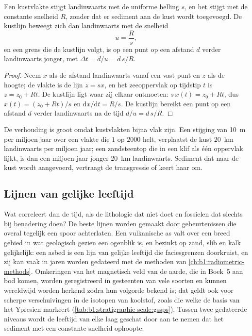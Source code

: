 \begin{proposition}\label{prop:b1:stratigraphic-scale:transgression}
Een kustvlakte stijgt landinwaarts met de uniforme helling $s$, en het  stijgt met de constante snelheid $R$, zonder dat er sediment aan de kust wordt toegevoegd. De kustlijn beweegt zich dan landinwaarts met de snelheid
\[
  u = \frac{R}{s},
\]
en een grens die de kustlijn volgt, is op een punt op een afstand $d$ verder landinwaarts jonger, met $\Delta t = d/u = d\,s/R$.
\end{proposition}

\begin{proof}
Neem $x$ als de afstand landinwaarts vanaf een vast punt en $z$ als de hoogte; de vlakte is de lijn $z = s x$, en het zeeoppervlak op tijdstip $t$ is $z = z_0 + R t$. De kustlijn ligt waar zij elkaar ontmoeten: $s\,x(t) = z_0 + R t$, dus $x(t) = (z_0 + R t)/s$ en $\mathrm dx/\mathrm dt = R/s$. De kustlijn bereikt een punt op een afstand $d$ verder landinwaarts na de tijd $d/u = d\,s/R$.
\end{proof}

De verhouding is groot omdat kustvlakten bijna vlak zijn. Een stijging van \qty{10}{m} per miljoen jaar over een vlakte die $1$ op $2000$ helt, verplaatst de kust \qty{20}{km} landinwaarts per miljoen jaar; een zandsteentop die in een klif als één oppervlak lijkt, is dan een miljoen jaar jonger \qty{20}{km} landinwaarts. Sediment dat naar de kust wordt aangevoerd, vertraagt de transgressie of keert haar om.

\subsection*{Lijnen van gelijke leeftijd}

Wat correleert dan de tijd, als de lithologie dat niet doet en fossielen dat slechts bij benadering doen? De beste lijnen worden gemaakt door gebeurtenissen die overal tegelijk een spoor achterlaten. Een vulkanische as valt over een breed gebied in wat geologisch gezien een ogenblik is, en bezinkt op zand, slib en kalk gelijkelijk: een asbed is een lijn van gelijke leeftijd die faciesgrenzen doorkruist, en zij kan vaak in jaren worden gedateerd met de methoden van \cref{ch:b1:radiometric-methods}. Omkeringen van het magnetisch veld van de aarde, die in Boek~5 aan bod komen, worden geregistreerd in gesteenten van vele soorten en kunnen wereldwijd worden herkend zodra hun volgorde bekend is; dat geldt ook voor scherpe verschuivingen in de isotopen van koolstof, zoals die welke de basis van het Ypresien markeert (\cref{tab:b1:stratigraphic-scale:gssps}). Tussen twee gedateerde niveaus wordt de leeftijd van elke laag geschat door aan te nemen dat het sediment met een constante snelheid ophoopte.

